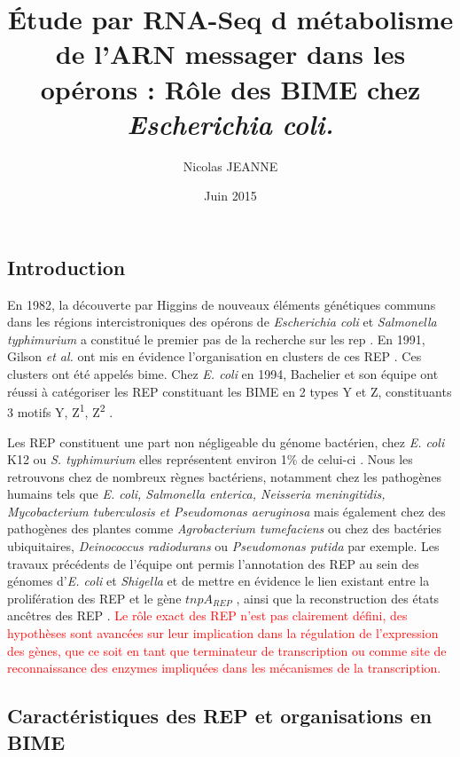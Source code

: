 \documentclass[12pt,a4paper]{report}
\author{Nicolas JEANNE}
\title{Étude par RNA-Seq d métabolisme de l'ARN messager dans les opérons : Rôle des BIME chez \textit{Escherichia coli.}}
\date{Juin 2015}
\begin{document}
\maketitle

\begin{onehalfspace}
\chapter*{Introduction}
En 1982, la découverte par Higgins de nouveaux éléments génétiques communs dans les régions intercistroniques des opérons de \textit{Escherichia coli} et \textit{Salmonella typhimurium} a constitué le premier pas de la recherche sur les \gls{rep} \citep{Higgins1982}. En 1991, Gilson \textit{et al.} ont mis en évidence l'organisation en clusters de ces REP \citep{Gilson1991}. Ces clusters ont été appelés \gls{bime}. Chez \textit{E. coli} en 1994, Bachelier et son équipe ont réussi à catégoriser les REP constituant les BIME en 2 types Y et Z, constituants 3 motifs Y, Z\textsuperscript{1}, Z\textsuperscript{2}  \citep{Bachellier1994}.
 
Les REP constituent une part non négligeable du génome bactérien, chez \textit{E. coli} K12 ou \textit{S. typhimurium} elles représentent environ 1\% de celui-ci \citep{Gilson1991}. Nous les retrouvons chez de nombreux règnes bactériens, notamment chez les pathogènes humains tels que \textit{E. coli, Salmonella enterica, Neisseria meningitidis, Mycobacterium tuberculosis et Pseudomonas aeruginosa} mais également chez des pathogènes des plantes comme \textit{Agrobacterium tumefaciens} ou chez des bactéries ubiquitaires, \textit{Deinococcus radiodurans} ou \textit{Pseudomonas putida} par exemple. Les travaux précédents de l'équipe ont permis l'annotation des REP au sein des génomes d'\textit{E. coli} et \textit{Shigella} et de mettre en évidence le lien existant entre la prolifération des REP et le gène $tnpA_{REP}$ \citep{Weyder2013,Bosc2014}, ainsi que la reconstruction des états ancêtres des REP \citep{Bosc2014}.  \textcolor{red}{Le rôle exact des REP n'est pas clairement défini, des hypothèses sont avancées sur leur implication dans la régulation de l'expression des gènes, que ce soit en tant que terminateur de transcription ou comme site de reconnaissance des enzymes impliquées dans les mécanismes de la transcription.}

\section*{Caractéristiques des REP et organisations en BIME}


\end{onehalfspace}
\end{document}
